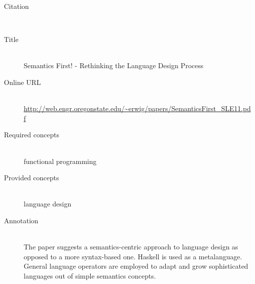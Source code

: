 \begin{description}
\item[Citation]\mbox{}\\
\cite{ErwigW12a}
\item[Title]\mbox{}\\
Semantics First! - Rethinking the Language Design Process
\item[Online URL]\mbox{}\\
{\footnotesize\url{http://web.engr.oregonstate.edu/~erwig/papers/SemanticsFirst_SLE11.pdf}}
\item[Required concepts]\mbox{}\\
functional programming\item[Provided concepts]\mbox{}\\
language design\item[Annotation]\mbox{}\\
The paper suggests a semantics-centric approach to language design as opposed to a more syntax-based one. Haskell is used as a metalanguage. General language operators are employed to adapt and grow sophisticated languages out of simple semantics concepts.
\end{description}

